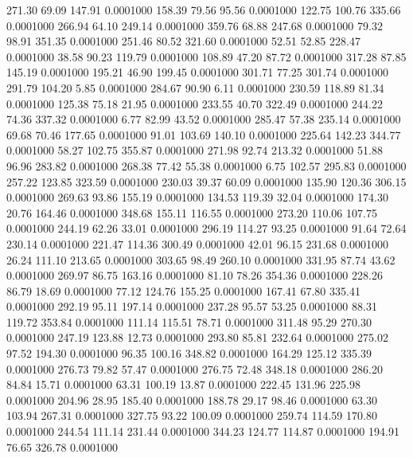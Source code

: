  271.30   69.09  147.91   0.0001000
 158.39   79.56   95.56   0.0001000
 122.75  100.76  335.66   0.0001000
 266.94   64.10  249.14   0.0001000
 359.76   68.88  247.68   0.0001000
  79.32   98.91  351.35   0.0001000
 251.46   80.52  321.60   0.0001000
  52.51   52.85  228.47   0.0001000
  38.58   90.23  119.79   0.0001000
 108.89   47.20   87.72   0.0001000
 317.28   87.85  145.19   0.0001000
 195.21   46.90  199.45   0.0001000
 301.71   77.25  301.74   0.0001000
 291.79  104.20    5.85   0.0001000
 284.67   90.90    6.11   0.0001000
 230.59  118.89   81.34   0.0001000
 125.38   75.18   21.95   0.0001000
 233.55   40.70  322.49   0.0001000
 244.22   74.36  337.32   0.0001000
   6.77   82.99   43.52   0.0001000
 285.47   57.38  235.14   0.0001000
  69.68   70.46  177.65   0.0001000
  91.01  103.69  140.10   0.0001000
 225.64  142.23  344.77   0.0001000
  58.27  102.75  355.87   0.0001000
 271.98   92.74  213.32   0.0001000
  51.88   96.96  283.82   0.0001000
 268.38   77.42   55.38   0.0001000
   6.75  102.57  295.83   0.0001000
 257.22  123.85  323.59   0.0001000
 230.03   39.37   60.09   0.0001000
 135.90  120.36  306.15   0.0001000
 269.63   93.86  155.19   0.0001000
 134.53  119.39   32.04   0.0001000
 174.30   20.76  164.46   0.0001000
 348.68  155.11  116.55   0.0001000
 273.20  110.06  107.75   0.0001000
 244.19   62.26   33.01   0.0001000
 296.19  114.27   93.25   0.0001000
  91.64   72.64  230.14   0.0001000
 221.47  114.36  300.49   0.0001000
  42.01   96.15  231.68   0.0001000
  26.24  111.10  213.65   0.0001000
 303.65   98.49  260.10   0.0001000
 331.95   87.74   43.62   0.0001000
 269.97   86.75  163.16   0.0001000
  81.10   78.26  354.36   0.0001000
 228.26   86.79   18.69   0.0001000
  77.12  124.76  155.25   0.0001000
 167.41   67.80  335.41   0.0001000
 292.19   95.11  197.14   0.0001000
 237.28   95.57   53.25   0.0001000
  88.31  119.72  353.84   0.0001000
 111.14  115.51   78.71   0.0001000
 311.48   95.29  270.30   0.0001000
 247.19  123.88   12.73   0.0001000
 293.80   85.81  232.64   0.0001000
 275.02   97.52  194.30   0.0001000
  96.35  100.16  348.82   0.0001000
 164.29  125.12  335.39   0.0001000
 276.73   79.82   57.47   0.0001000
 276.75   72.48  348.18   0.0001000
 286.20   84.84   15.71   0.0001000
  63.31  100.19   13.87   0.0001000
 222.45  131.96  225.98   0.0001000
 204.96   28.95  185.40   0.0001000
 188.78   29.17   98.46   0.0001000
  63.30  103.94  267.31   0.0001000
 327.75   93.22  100.09   0.0001000
 259.74  114.59  170.80   0.0001000
 244.54  111.14  231.44   0.0001000
 344.23  124.77  114.87   0.0001000
 194.91   76.65  326.78   0.0001000
